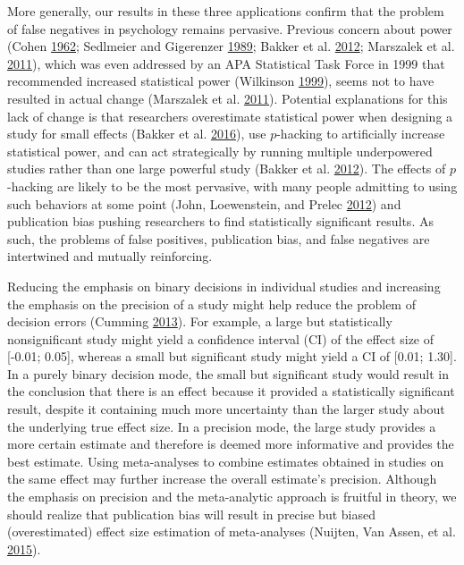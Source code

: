 \documentclass[a5paper]{book}
\begin{document}
More generally, our results in these three applications confirm that the
problem of false negatives in psychology remains pervasive. Previous
concern about power (Cohen
\protect\hyperlink{ref-doi:10.1037ux2fh0045186}{1962}; Sedlmeier and
Gigerenzer
\protect\hyperlink{ref-doi:10.1037ux2f0033-2909.105.2.309}{1989}; Bakker
et al. \protect\hyperlink{ref-doi:10.1177ux2f1745691612459060}{2012};
Marszalek et al.
\protect\hyperlink{ref-doi:10.2466ux2f03.11.pms.112.2.331-348}{2011}),
which was even addressed by an APA Statistical Task Force in 1999 that
recommended increased statistical power (Wilkinson
\protect\hyperlink{ref-doi:10.1037ux2f0003-066x.54.8.594}{1999}), seems
not to have resulted in actual change (Marszalek et al.
\protect\hyperlink{ref-doi:10.2466ux2f03.11.pms.112.2.331-348}{2011}).
Potential explanations for this lack of change is that researchers
overestimate statistical power when designing a study for small effects
(Bakker et al.
\protect\hyperlink{ref-doi:10.1177ux2f0956797616647519}{2016}), use
\(p\)-hacking to artificially increase statistical power, and can act
strategically by running multiple underpowered studies rather than one
large powerful study (Bakker et al.
\protect\hyperlink{ref-doi:10.1177ux2f1745691612459060}{2012}). The
effects of \(p\)-hacking are likely to be the most pervasive, with many
people admitting to using such behaviors at some point (John,
Loewenstein, and Prelec
\protect\hyperlink{ref-doi:10.1177ux2f0956797611430953}{2012}) and
publication bias pushing researchers to find statistically significant
results. As such, the problems of false positives, publication bias, and
false negatives are intertwined and mutually reinforcing.

Reducing the emphasis on binary decisions in individual studies and
increasing the emphasis on the precision of a study might help reduce
the problem of decision errors (Cumming
\protect\hyperlink{ref-doi:10.1177ux2f0956797613504966}{2013}). For
example, a large but statistically nonsignificant study might yield a
confidence interval (CI) of the effect size of {[}-0.01; 0.05{]},
whereas a small but significant study might yield a CI of {[}0.01;
1.30{]}. In a purely binary decision mode, the small but significant
study would result in the conclusion that there is an effect because it
provided a statistically significant result, despite it containing much
more uncertainty than the larger study about the underlying true effect
size. In a precision mode, the large study provides a more certain
estimate and therefore is deemed more informative and provides the best
estimate. Using meta-analyses to combine estimates obtained in studies
on the same effect may further increase the overall estimate's
precision. Although the emphasis on precision and the meta-analytic
approach is fruitful in theory, we should realize that publication bias
will result in precise but biased (overestimated) effect size estimation
of meta-analyses (Nuijten, Van Assen, et al.
\protect\hyperlink{ref-doi:10.1037ux2fgpr0000034}{2015}).
\end{document}
